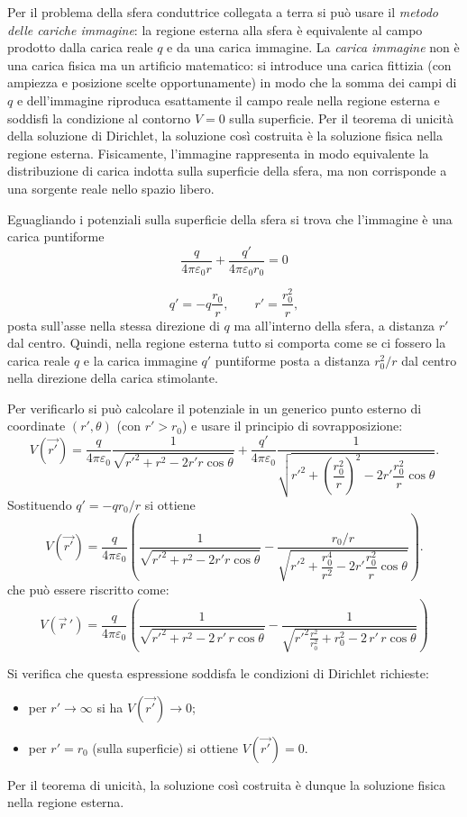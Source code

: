 \documentclass{book}
\begin{document}
Per il problema della sfera conduttrice collegata a terra si può usare il \emph{metodo delle cariche immagine}: la regione esterna alla sfera è equivalente al campo prodotto dalla carica reale $q$ e da una carica immagine.  
La \emph{carica immagine} non è una carica fisica ma un artificio matematico: si introduce una carica fittizia (con ampiezza e posizione scelte opportunamente) in modo che la somma dei campi di $q$ e dell'immagine riproduca esattamente il campo reale nella regione esterna e soddisfi la condizione al contorno $V=0$ sulla superficie. Per il teorema di unicità della soluzione di Dirichlet, la soluzione così costruita è la soluzione fisica nella regione esterna. Fisicamente, l'immagine rappresenta in modo equivalente la distribuzione di carica indotta sulla superficie della sfera, ma non corrisponde a una sorgente reale nello spazio libero.

Eguagliando i potenziali sulla superficie della sfera si trova che l'immagine è una carica puntiforme
$$
\frac{q}{4\pi\varepsilon_0 r} + \frac{q'}{4\pi\varepsilon_0 r_0}  = 0 
$$

\[
q'=-q\frac{r_0}{r},\qquad r'=\frac{r_0^2}{r},
\]
posta sull'asse nella stessa direzione di $q$ ma all'interno della sfera, a distanza $r'$ dal centro. Quindi, nella regione esterna tutto si comporta come se ci fossero la carica reale $q$ e la carica immagine $q'$ puntiforme posta a distanza $r_0^2/r$ dal centro nella direzione della carica stimolante.

Per verificarlo si può calcolare il potenziale in un generico punto esterno di coordinate $(r',\theta)$ (con $r'>r_0$) e usare il principio di sovrapposizione:
\[
V(\vec{ r'}) = \frac{q}{4\pi\varepsilon_0}\frac{1}{\sqrt{r'^{2}+r^{2}-2r'r\cos\theta}}
+\frac{q'}{4\pi\varepsilon_0}\frac{1}{\sqrt{r'^{2}+\left(\dfrac{r_0^{2}}{r}\right)^{2}-2r'\dfrac{r_0^{2}}{r}\cos\theta}}.
\]
Sostituendo $q'=-q r_0/r$ si ottiene
\[
V(\vec{ r'}) = \frac{q}{4\pi\varepsilon_0}\left(
\frac{1}{\sqrt{r'^{2}+r^{2}-2r'r\cos\theta}}
- \frac{r_0/r}{\sqrt{r'^{2}+\dfrac{r_0^{4}}{r^{2}}-2r'\dfrac{r_0^{2}}{r}\cos\theta}}
\right).
\]
che può essere riscritto come:
\[
V(\vec{r}\,') =
\frac{q}{4\pi\varepsilon_0}
\left(
\frac{1}{\sqrt{r'^{2} + r^{2} - 2\,r'\,r\cos\theta}}
-
\frac{1}{\sqrt{r'^{2}\frac{r^{2}}{r_0^{2}} + r_{0}^{2} - 2\,r'\,r\cos\theta}}
\right)
\]

Si verifica che questa espressione soddisfa le condizioni di Dirichlet richieste:
\begin{itemize}
  \item per $r'\to\infty$ si ha $V(\vec{r'})\to 0$;
  \item per $r'=r_0$ (sulla superficie) si ottiene $V(\vec{ r'})=0$.
\end{itemize}
Per il teorema di unicità, la soluzione così costruita è dunque la soluzione fisica nella regione esterna.
\end{document}
